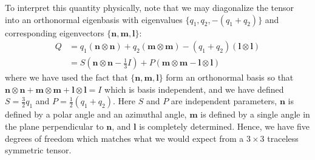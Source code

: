 \documentclass[reqno]{article}
\begin{document}
  To interpret this quantity physically, note that we may diagonalize the tensor into an
  orthonormal eigenbasis with eigenvalues $\{q_1, q_2, -(q_1 + q_2)\}$ and corresponding
  eigenvectors $\{\mathbf{n}, \mathbf{m}, \mathbf{l}\}$:
  \begin{equation}
    \begin{split}
    Q
    &=
    q_1 (\mathbf{n} \otimes \mathbf{n})
    + q_2 (\mathbf{m} \otimes \mathbf{m})
    - (q_1 + q_2) (\mathbf{l} \otimes \mathbf{l}) \\
    &= S (\mathbf{n} \otimes \mathbf{n} - \tfrac13 I)
    + P (\mathbf{m} \otimes \mathbf{m} - \mathbf{l} \otimes \mathbf{l})
    \end{split}
  \end{equation}
  where we have used the fact that $\{\mathbf{n}, \mathbf{m}, \mathbf{l}\}$ form
  an orthonormal basis so that $\mathbf{n} \otimes \mathbf{n} + \mathbf{m}
  \otimes \mathbf{m} + \mathbf{l} \otimes \mathbf{l} = I$ which is basis
  independent, and we have defined $S = \tfrac32 q_1$ and $P = \tfrac12 (q_1 + q_2)$.
  Here $S$ and $P$ are independent parameters, $\mathbf{n}$ is defined by a
  polar angle and an azimuthal angle, $\mathbf{m}$ is defined by a single angle
  in the plane perpendicular to $\mathbf{n}$, and $\mathbf{l}$ is completely
  determined.
  Hence, we have five degrees of freedom which matches what we would expect
  from a $3\times 3$ traceless symmetric tensor.
  
\end{document}
